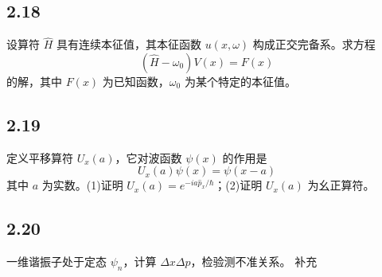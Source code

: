 \subsection{2.18}
设算符 $\hat{H}$ 具有连续本征值，其本征函数 $u(x, \omega)$ 构成正交完备系。求方程
$$(\hat{H} - \omega_0)V(x) = F(x)$$
的解，其中 $F(x)$ 为已知函数，$\omega_0$ 为某个特定的本征值。

\subsection{2.19}
定义平移算符 $U_x(a)$，它对波函数 $\psi(x)$ 的作用是
$$U_x(a)\psi(x) = \psi(x-a)$$
其中 $a$ 为实数。(1)证明 $U_x(a) = e^{-i a \hat{p}_x / \hbar}$；(2)证明 $U_x(a)$ 为幺正算符。

\newpage
\subsection{2.20}
一维谐振子处于定态 $\psi_n$，计算 $\Delta x \Delta p$，检验测不准关系。
补充

